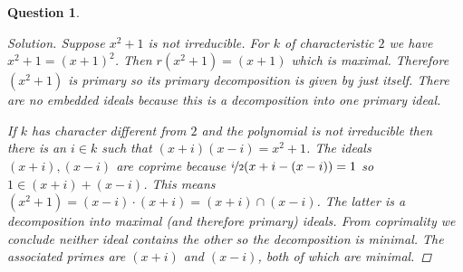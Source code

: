 \documentclass{article}
\newenvironment{solution}{\begin{proof}[Solution]\renewcommand\qedsymbol{}}{\end{proof}}
\newtheorem{question}{Question}
\theoremstyle{definition}
\begin{document}
\begin{question}
\begin{enumerate}[(a)]
\begin{solution}
                  Suppose \(x^{2}+1\) is not irreducible. For \(k\) of
                  characteristic \(2\) we have \(x^{2}+1=(x+1)^{2}\). Then
                  \(r(x^{2}+1)=(x+1)\) which is maximal. Therefore \((x^{2}+1)\)
                  is primary so its primary decomposition is given by just
                  itself. There are no embedded ideals because this is a
                  decomposition into one primary ideal.

                  If \(k\) has character different from \(2\) and the polynomial
                  is not irreducible then there is an \(i\in k\) such that
                  \((x+i)(x-i)=x^{2}+1\). The ideals \((x+i),(x-i)\) are coprime
                  because \(\nicefrac{i}{2}(x+i-(x-i))=1\) so \(1\in
                  (x+i)+(x-i)\). This means
                  \((x^{2}+1)=(x-i)\cdot(x+i)=(x+i)\cap(x-i)\). The latter is a
                  decomposition into maximal (and therefore primary) ideals.
                  From coprimality we conclude neither ideal contains the other
                  so the decomposition is minimal. The associated primes are
                  \((x+i)\) and \((x-i)\), both of which are minimal.
              \end{solution}
    \end{enumerate}
\end{question}
\end{document}
